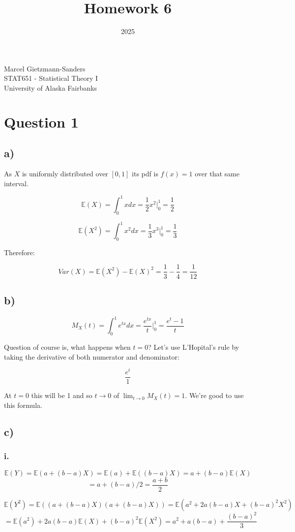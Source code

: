 \documentclass[11pt]{article}
\title{Homework 6}
\date{2025}
\makeatletter
\renewcommand{\maketitle}{
\begin{center}

\pagestyle{empty}

{\Large \bf \@title\par}
\vspace{1cm}

{\LARGE Marcel Gietzmann-Sanders}\\[1cm]

STAT651 - Statistical Theory I \\
University of Alaska Fairbanks


\end{center}
}\makeatother
\makeatother
\begin{document}
\maketitle

\section*{Question 1}

\subsection*{a)}

As $X$ is uniformly distributed over $[0, 1]$ its pdf is $f(x)=1$ over that same interval. 

$$\mathbb{E}(X) = \int_0^1 xdx = \frac{1}{2}x^2 \Big|_0^1=\frac{1}{2}$$

$$\mathbb{E}(X^2) = \int_0^1 x^2dx = \frac{1}{3}x^3 \Big|_0^1=\frac{1}{3}$$

Therefore:

$$Var(X)=\mathbb{E}(X^2)-\mathbb{E}(X)^2=\frac{1}{3} - \frac{1}{4} = \frac{1}{12}$$

\subsection*{b)}

$$M_X(t) = \int_0^1 e^{tx}dx = \frac{e^{tx}}{t}\Big|_0^1=\frac{e^t-1}{t}$$

Question of course is, what happens when $t=0$? Let's use L'Hopital's rule by taking the derivative of both numerator and denominator:

$$\frac{e^t}{1}$$

At $t=0$ this will be 1 and so $t\rightarrow 0$ of $\lim_{t\rightarrow 0}M_X(t)=1$. We're good to use this formula. 

\subsection*{c)}

\subsubsection*{i.}

$$\mathbb{E}(Y) =\mathbb{E}(a+(b-a)X)=\mathbb{E}(a)+\mathbb{E}((b-a)X)=a+(b-a)\mathbb{E}(X)$$
$$=a+(b-a)/2=\frac{a+b}{2}$$

$$\mathbb{E}(Y^2) =\mathbb{E}((a+(b-a)X)(a+(b-a)X))=\mathbb{E}(a^2+2a(b-a)X + (b-a)^2X^2)$$
$$=\mathbb{E}(a^2)+2a(b-a)\mathbb{E}(X) + (b-a)^2\mathbb{E}(X^2)=a^2+a(b-a)+\frac{(b-a)^2}{3}$$
\end{document}
